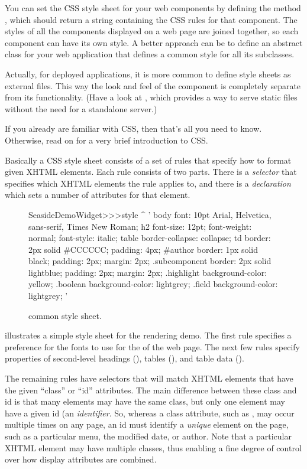 \documentclass[a4paper,10pt,twoside]{book}
\begin{document}
You can set the CSS style sheet for your web components by defining the method , which should return a string containing the CSS rules for that component.
The styles of all the components displayed on a web page are joined together, so each component can have its own style.
A better approach can be to define an abstract class for your web application that defines a common style for all its subclasses.

Actually, for deployed applications, it is more common to define style sheets as external files.
This way the look and feel of the component is completely separate from its functionality.
(Have a look at , which provides a way to serve static files without the need for a standalone server.)

If you already are familiar with CSS, then that's all you need to know.
Otherwise, read on for a very brief introduction to CSS.

Basically a CSS style sheet consists of a set of rules that specify how to format given XHTML elements.
Each rule consists of two parts.
There is a \emph{selector} that specifies which XHTML elements the rule applies to, and there is a \emph{declaration} which sets a number of attributes for that element.

\begin{figure}[tb]
\begin{code}{}
SeasideDemoWidget>>>style
	^ '
body {
	font: 10pt Arial, Helvetica, sans-serif, Times New Roman;
}
h2 {
	font-size: 12pt;
	font-weight: normal;
	font-style: italic;
}
table { border-collapse: collapse; }
td {
	border: 2px solid #CCCCCC;
	padding: 4px;
}
#author {
	border: 1px solid black;
	padding: 2px;
	margin: 2px;
}
.subcomponent {
	border: 2px solid lightblue;
	padding: 2px;
	margin: 2px;
}
.highlight { background-color: yellow; }
.boolean { background-color: lightgrey; }
.field { background-color: lightgrey; }
'
\end{code}
\caption{ common style sheet.
\label{fig:democss}}
\end{figure}
 illustrates a simple style sheet for the rendering demo.
The first rule specifies a preference for the fonts to use for the  of the web page.
The next few rules specify properties of second-level headings (), tables (), and table data ().

The remaining rules have selectors that will match XHTML elements that have the given ``class'' or ``id'' attributes.
The main difference between these class and id is that many elements may have the same class, but only one element may have a given id (\ie an \emph{identifier}. 
So, whereas a class attribute, such as , may occur multiple times on any page, an id must identify a \emph{unique} element on the page, such as a particular menu, the modified date, or author.
Note that a particular XHTML element may have multiple classes, thus enabling a fine degree of control over how display attributes are combined. 
\end{document}
